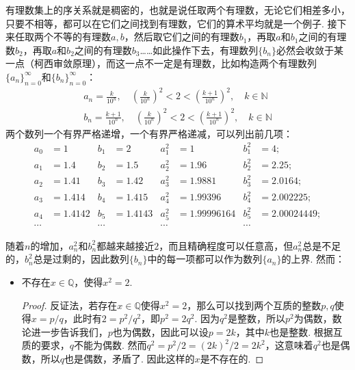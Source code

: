 有理数集上的序关系就是稠密的，也就是说任取两个有理数，无论它们相差多小，只要不相等，都可以在它们之间找到有理数，它们的算术平均就是一个例子. 接下来任取两个不等的有理数\(a,b\)，然后取它们之间的有理数\(b_1\)，再取\(a\)和\(b_1\)之间的有理数\(b_2\)，再取\(a\)和\(b_2\)之间的有理数\(b_3\)……如此操作下去，有理数列\(\{b_n\}\)必然会收敛于某一点（柯西审敛原理），而这一点不一定是有理数，比如构造两个有理数列\(\{a_n\}_{n=0}^{\infty}\)和\(\{b_n\}_{n=0}^{\infty}\)：
\begin{eqnarray*}
    a_n=\frac{k}{10^n}, \quad\left(\frac{k}{10^n}\right)^2<2<\left(\frac{k+1}{10^n}\right)^2, \quad k\in\mathbb{N} \\
    b_n=\frac{k+1}{10^n}, \quad\left(\frac{k}{10^n}\right)^2<2<\left(\frac{k+1}{10^n}\right)^2, \quad k\in\mathbb{N}
\end{eqnarray*}
两个数列一个有界严格递增，一个有界严格递减，可以列出前几项：
\newline
\begin{align*}
    a_0 &= 1 & b_1 &= 2 & a_1^2 &= 1 & b_1^2 &= 4; \\
    a_1 &= 1.4 & b_2 &= 1.5 & a_2^2 &= 1.96 & b_2^2 &= 2.25; \\
    a_2 &= 1.41 & b_3 &= 1.42 & a_3^2 &= 1.9881 & b_3^2 &= 2.0164; \\
    a_3 &= 1.414 & b_4 &= 1.415 & a_4^2 &= 1.99396 & b_4^2 &= 2.002225; \\
    a_4 &= 1.4142 & b_5 &= 1.4143 & a_5^2 &= 1.99996164 & b_5^2 &= 2.00024449; \\
\cdots & & \cdots && \cdots && \cdots
\end{align*}

随着\(n\)的增加，\(a_n^2\)和\(b_n^2\)都越来越接近\(2\)，而且精确程度可以任意高，但\(a_n^2\)总是不足的，\(b_n^2\)总是过剩的，因此数列\(\{b_n\}\)中的每一项都可以作为数列\(\{a_n\}\)的上界. 然而：

\begin{itemize}
    \item 不存在\(x \in \mathbb{Q}\)，使得\(x^2 = 2\).
    \begin{proof}
        反证法，若存在\(x \in \mathbb{Q}\)使得\(x^2 = 2\)，那么可以找到两个互质的整数\(p,q\)使得\(x = p/q\)，此时有\(2 = p^2/q^2\)，即\(p^2 = 2q^2\). 因为\(q^2\)是整数，所以\(p^2\)为偶数，数论进一步告诉我们，\(p\)也为偶数，因此可以设\(p=2k\)，其中\(k\)也是整数. 根据互质的要求，\(q\)不能为偶数. 然而\(q^2 = p^2/2 = (2k)^2/2 = 2k^2\)，这意味着\(q^2\)也是偶数，所以\(q\)也是偶数，矛盾了. 因此这样的\(x\)是不存在的.
    \end{proof}
\end{itemize}

